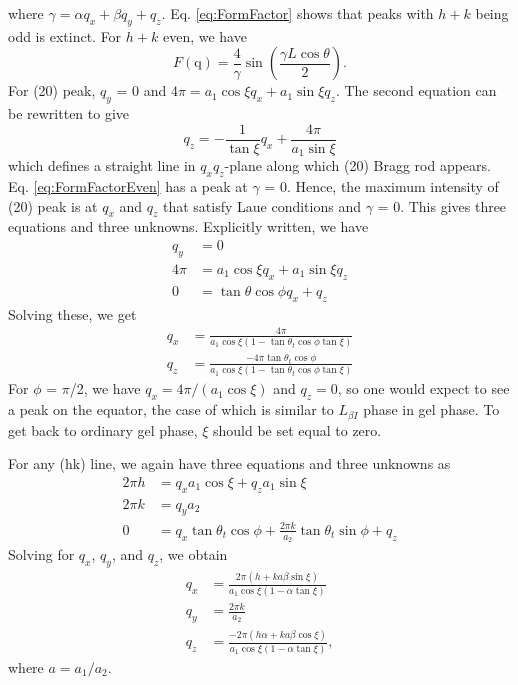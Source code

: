 \documentclass[letterpaper,12pt]{article}
\begin{document}
where $\gamma=\alpha q_x+\beta q_y+q_z$. Eq. \ref{eq:FormFactor} shows that peaks with $h+k$ being odd is extinct. For $h+k$ even, we have
\begin{equation}%
	F(\mathrm{q})=\frac{4}{\gamma}\sin\left(\frac{\gamma L\cos\theta}{2}\right)\label{eq:FormFactorEven}.
\end{equation} 
For (20) peak, $q_y$ = 0 and $4\pi=a_1\cos\xi q_x+a_1\sin\xi q_z$. The second equation can be rewritten to give
\begin{equation}
	q_z=-\frac{1}{\tan\xi}q_x+\frac{4\pi}{a_1\sin\xi}
\end{equation}
which defines a straight line in $q_xq_z$-plane along which (20) Bragg rod appears. Eq. \ref{eq:FormFactorEven} has a peak at $\gamma$ = 0. Hence, the maximum intensity of (20) peak is at $q_x$ and $q_z$ that satisfy Laue conditions and $\gamma$ = 0. This gives three equations and three unknowns. Explicitly written, we have
\begin{align}
	q_y &= 0\\
	4\pi &= a_1\cos\xi q_x+a_1\sin\xi q_z\\
	0 &= \tan\theta\cos\phi q_x+q_z
\end{align}
Solving these, we get
\begin{align}%
	q_x &= \frac{4\pi}{a_1\cos\xi(1-\tan\theta_t\cos\phi\tan\xi)}\\
	q_z &= \frac{-4\pi\tan\theta_t\cos\phi}{a_1\cos\xi(1-\tan\theta_t\cos\phi\tan\xi)}
\end{align}
For $\phi$ = $\pi$/2, we have $q_x=4\pi/(a_1\cos\xi)$ and $q_z=0$, so one would expect to see a peak on the equator, the case of which is similar to $L_{\beta I}$ phase in gel phase. To get back to ordinary gel phase, $\xi$ should be set equal to zero.

For any (hk) line, we again have three equations and three unknowns as
\begin{align}
	2\pi h &= q_xa_1\cos\xi +q_za_1\sin\xi\\
	2\pi k &= q_ya_2\\
	0 &= q_x\tan\theta_t\cos\phi + \frac{2\pi k}{a_2}\tan\theta_t\sin\phi +q_z
\end{align}
Solving for $q_x$, $q_y$, and $q_z$, we obtain
\begin{align}
	q_x &= \frac{2\pi(h+ka\beta\sin\xi)}{a_1\cos\xi(1-\alpha\tan\xi)}\\
	q_y &= \frac{2\pi k}{a_2}\\
	q_z &= \frac{-2\pi(h\alpha+ka\beta\cos\xi)}{a_1\cos\xi(1-\alpha\tan\xi)},
\end{align}
where $a=a_1/a_2$.
\end{document}
